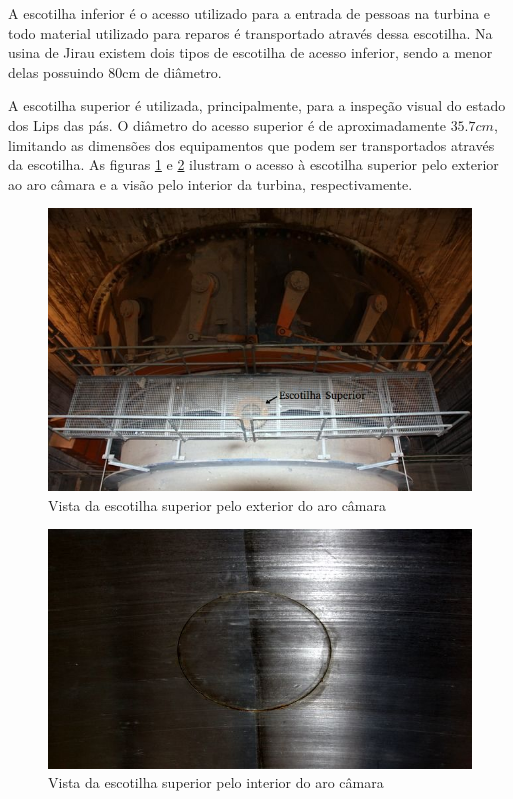 A escotilha inferior é o acesso utilizado para a entrada de pessoas na turbina e todo 
material utilizado para reparos é transportado através dessa escotilha. Na usina de Jirau existem dois 
tipos de escotilha de acesso inferior, sendo a menor delas possuindo 80cm de diâmetro. 

A escotilha superior é utilizada, principalmente, para a inspeção visual do
estado dos Lips das pás.
O diâmetro do acesso superior é de aproximadamente $35.7cm$, limitando as
dimensões dos equipamentos que podem ser transportados através da escotilha. As figuras \ref{fig::esc_sup_ext} e
\ref{fig::esc_sup_int} ilustram o acesso à escotilha superior pelo exterior ao
aro câmara e a visão pelo interior da turbina,
respectivamente.

\begin{figure}[h!]	
	\centering
	\includegraphics[width=0.8\columnwidth]{sota/figs/viagem/img_4979_mod}
	\caption{Vista da escotilha superior pelo exterior do aro câmara}
	\label{fig::esc_sup_ext}
\end{figure}

\begin{figure}[h!]	
	\centering
	\includegraphics[width=0.8\columnwidth]{sota/figs/viagem/img_4982}
	\caption{Vista da escotilha superior pelo interior do aro câmara}
	\label{fig::esc_sup_int}
\end{figure}

